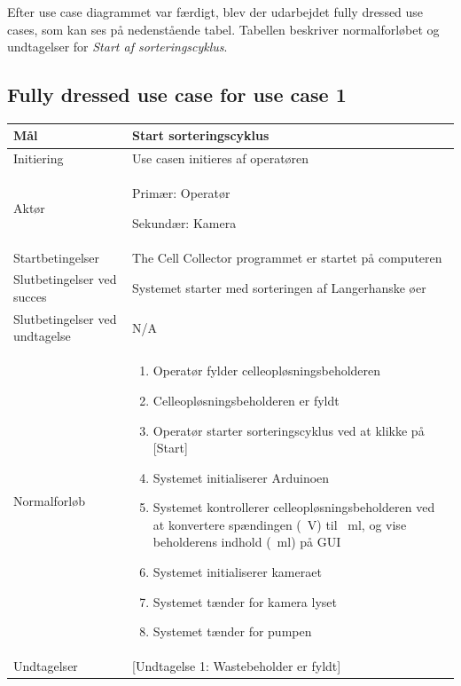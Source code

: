 Efter use case diagrammet var færdigt, blev der udarbejdet fully dressed use cases, som kan ses på nedenstående tabel. Tabellen beskriver normalforløbet og undtagelser for \textit{Start af sorteringscyklus}. 

\newpage 
\subsection{Fully dressed use case for use case 1}
\begin{center}
		\begin{longtable}{ | m{4cm} | m{8cm}| } 
			\hline
			Mål & Start sorteringscyklus \\ 
			\hline
			Initiering &  Use casen initieres af operatøren\\
			\hline
			Aktør & 
			Primær: Operatør
			
			 Sekundær: Kamera			  \\ 
			\hline
			Startbetingelser & The Cell Collector programmet er startet på computeren \\ 
			\hline	
			Slutbetingelser ved succes & Systemet starter med sorteringen af Langerhanske øer \\
			\hline
			Slutbetingelser ved undtagelse & N/A \\
			\hline
			Normalforløb & \begin{enumerate}
				\item Operatør fylder celleopløsningsbeholderen
				\item Celleopløsningsbeholderen er fyldt
				\item Operatør starter sorteringscyklus ved at klikke på [Start]
				\subitem [Undtagelse 1: Wastebeholder er fyldt] 
				\item Systemet initialiserer Arduinoen
				\subitem [Undtagelse 2: Ingen forbindelse til Arduino]
				\item Systemet kontrollerer celleopløsningsbeholderen ved at konvertere spændingen (\SI{}{\volt})  til \SI{}{\milli\litre}, og vise beholderens indhold (\SI{}{\milli\litre}) på GUI
				\item Systemet initialiserer kameraet
				\subitem [Undtagelse 3: Kameraet initialiserer ikke]
				\item Systemet tænder for kamera lyset
				\item Systemet tænder for pumpen
				
			\end{enumerate} \\ 
			\hline
			Undtagelser & [Undtagelse 1: Wastebeholder er fyldt] 
			

\end{longtable}
\end{center}
